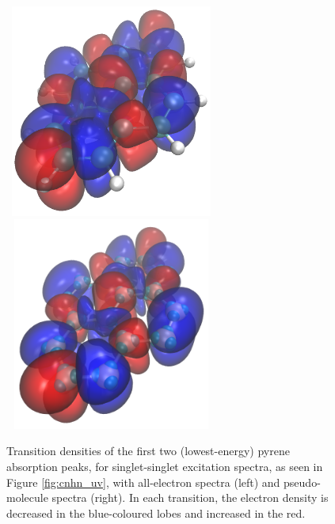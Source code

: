 \documentclass[12pt]{article}
\begin{document}
\begin{figure}
\begin{center}
\vspace{5mm}
\includegraphics[width=7cm, height=7cm]{pyrene_peak2_ref_white}
\includegraphics[width=7cm, height=7cm]{pyrene_peak2_ps_white}
\end{center}
\caption{Transition densities of the first two (lowest-energy) pyrene absorption peaks, for singlet-singlet excitation spectra, as seen in Figure \ref{fig:cnhn_uv}, with all-electron spectra (left) and pseudo-molecule spectra (right). In each transition, the electron density is decreased in the blue-coloured lobes and increased in the red.}
\label{fig:transitiondensities}
\end{figure}

\clearpage
\end{document}
